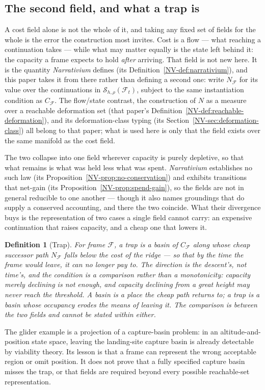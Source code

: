 \documentclass[11pt,a4paper]{article}
\newtheorem{definition}{Definition}[section]
\theoremstyle{remark}
\newcommand{\Frame}{\mathcal F}
\newcommand{\Seldon}{\mathcal S}
\begin{document}
\subsection*{The second field, and what a trap is}

A cost field alone is not the whole of it, and taking any fixed set of fields for the whole is the
error the construction most invites. Cost is a flow --- what reaching a continuation takes --- while
what may matter equally is the state left behind it: the capacity a frame expects to hold
\emph{after} arriving. That field is not new here. It is the quantity \emph{Narrativium} defines
(its Definition~\ref{NV-def:narrativium}), and
this paper takes it from there rather than defining a second one: write $N_{\Frame}$ for its value over
the continuations in $\Seldon_{h,\rho}(\Frame_t)$, subject to the same instantiation condition as
$C_{\Frame}$. The flow/state contrast, the construction of $N$ as a measure over a reachable
deformation set (that paper's Definition~\ref{NV-def:reachable-deformation}), and its
deformation-class typing (its Section~\ref{NV-sec:deformation-class}) all belong to that paper; what
is used here is only that the field exists over the same manifold as the cost field.

The two collapse into one field wherever capacity is purely depletive, so that what remains is what
was held less what was spent. \emph{Narrativium} establishes no such law
(its Proposition~\ref{NV-prop:no-conservation}) and exhibits transitions
that net-gain (its Proposition~\ref{NV-prop:spend-gain}), so the fields are not in general reducible
to one another --- though it also names
groundings that do supply a conserved accounting, and there the two coincide. What their divergence
buys is the representation of two cases a single field cannot carry: an expensive continuation that
raises capacity, and a cheap one that lowers it.

\begin{definition}[Trap]\label{def:trap}
For frame $\Frame$, a \emph{trap} is a basin of $C_{\Frame}$ along whose cheap successor path $N_{\Frame}$
falls below the cost of the ridge --- so that by the time the frame would leave, it can no longer pay
to. The direction is the descent's, not time's, and the condition is a comparison rather than a
monotonicity: capacity merely declining is not enough, and capacity declining from a great height may
never reach the threshold. A basin is a place the cheap path returns to; a trap is a basin whose
occupancy erodes the means of leaving it. The comparison is between the two fields and cannot be
stated within either.
\end{definition}
The glider example is a projection of a capture-basin problem: in an
altitude-and-position state space, leaving the landing-site capture basin
is already detectable by viability theory. Its lesson is that a frame can
represent the wrong acceptable region or omit position. It does not prove
that a fully specified capture basin misses the trap, or that fields are
required beyond every possible reachable-set representation.
\end{document}
